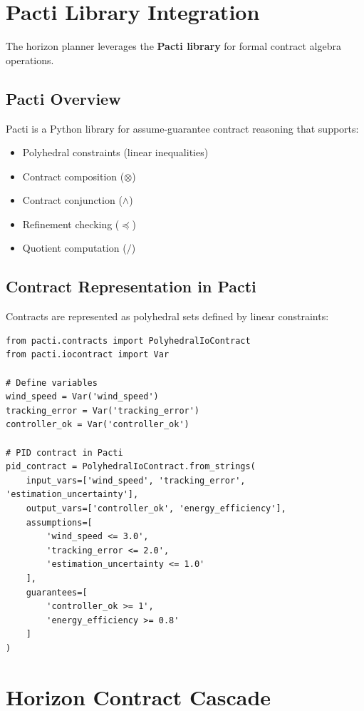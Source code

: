 \section{Pacti Library Integration}

The horizon planner leverages the \textbf{Pacti library} for formal contract algebra operations.

\subsection{Pacti Overview}

Pacti is a Python library for assume-guarantee contract reasoning that supports:
\begin{itemize}
    \item Polyhedral constraints (linear inequalities)
    \item Contract composition ($\otimes$)
    \item Contract conjunction ($\wedge$)
    \item Refinement checking ($\preceq$)
    \item Quotient computation ($/$)
\end{itemize}

\subsection{Contract Representation in Pacti}

Contracts are represented as polyhedral sets defined by linear constraints:

\begin{lstlisting}[caption={Pacti contract definition}]
from pacti.contracts import PolyhedralIoContract
from pacti.iocontract import Var

# Define variables
wind_speed = Var('wind_speed')
tracking_error = Var('tracking_error')
controller_ok = Var('controller_ok')

# PID contract in Pacti
pid_contract = PolyhedralIoContract.from_strings(
    input_vars=['wind_speed', 'tracking_error', 'estimation_uncertainty'],
    output_vars=['controller_ok', 'energy_efficiency'],
    assumptions=[
        'wind_speed <= 3.0',
        'tracking_error <= 2.0',
        'estimation_uncertainty <= 1.0'
    ],
    guarantees=[
        'controller_ok >= 1',
        'energy_efficiency >= 0.8'
    ]
)
\end{lstlisting}

\section{Horizon Contract Cascade}

